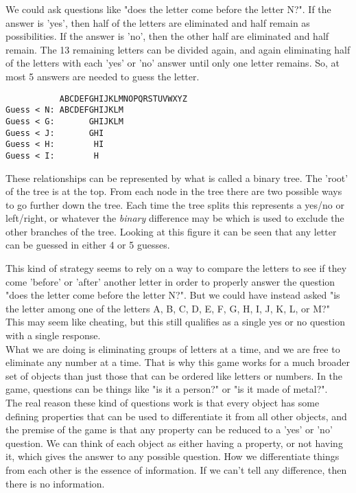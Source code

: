 We could ask questions like "does the letter come before the letter N?". If the answer is 'yes', then half of the letters are eliminated and half remain as possibilities. If the answer is 'no', then the other half are eliminated and half remain. The 13 remaining letters can be divided again, and again eliminating half of the letters with each 'yes' or 'no' answer until only one letter remains. So, at most 5 answers are needed to guess the letter.\\

\begin{verbatim}
           ABCDEFGHIJKLMNOPQRSTUVWXYZ
Guess < N: ABCDEFGHIJKLM
Guess < G:       GHIJKLM
Guess < J:       GHI
Guess < H:        HI
Guess < I:        H
\end{verbatim}

These relationships can be represented by what is called a binary tree. The 'root' of the tree is at the top. From each node in the tree there are two possible ways to go further down the tree. Each time the tree splits this represents a yes/no or left/right, or whatever the \textit{binary} difference may be which is used to exclude the other branches of the tree. Looking at this figure it can be seen that any letter can be guessed in either 4 or 5 guesses.

\begin{center}\end{center}

This kind of strategy seems to rely on a way to compare the letters to see if they come 'before' or 'after' another letter in order to properly answer the question "does the letter come before the letter N?". But we could have instead asked "is the letter among one of the letters A, B, C, D, E, F, G, H, I, J, K, L, or M?" This may seem like cheating, but this still qualifies as a single yes or no question with a single response.\\

What we are doing is eliminating groups of letters at a time, and we are free to eliminate any number at a time. That is why this game works for a much broader set of objects than just those that can be ordered like letters or numbers. In the game, questions can be things like "is it a person?" or "is it made of metal?".\\

The real reason these kind of questions work is that every object has some defining properties that can be used to differentiate it from all other objects, and the premise of the game is that any property can be reduced to a 'yes' or 'no' question. We can think of each object as either having a property, or not having it, which gives the answer to any possible question. How we differentiate things from each other is the essence of information. If we can't tell any difference, then there is no information.\\

